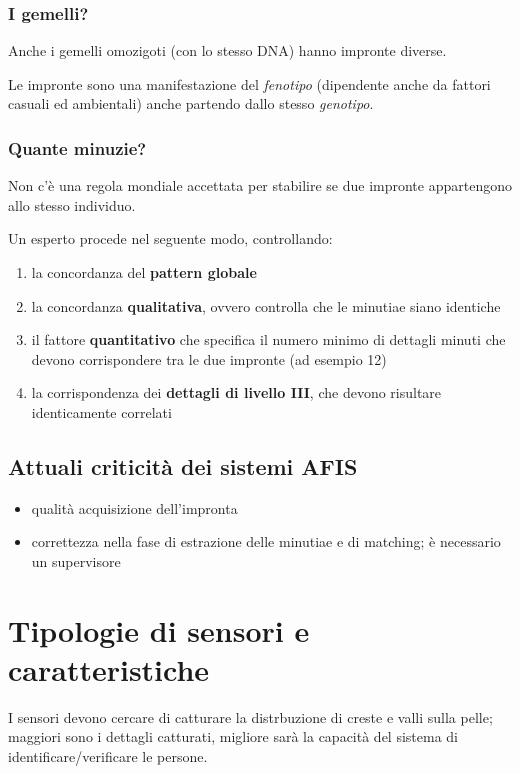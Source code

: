 \subsubsection{I gemelli?}

Anche i gemelli omozigoti (con lo stesso DNA) hanno impronte diverse.

\noindent Le impronte sono una manifestazione del \textit{fenotipo} (dipendente anche da fattori casuali ed 
ambientali) anche partendo dallo stesso \textit{genotipo}.

\subsubsection{Quante minuzie?}
Non c'è una regola mondiale accettata per stabilire se due impronte appartengono allo stesso
individuo.

Un esperto procede nel seguente modo, controllando:
\begin{enumerate}
    \item la concordanza del \textbf{pattern globale}
    \item la concordanza \textbf{qualitativa}, ovvero controlla che le minutiae siano identiche
    \item il fattore \textbf{quantitativo} che specifica il numero minimo di dettagli minuti che
    devono corrispondere tra le due impronte (ad esempio 12)
    \item la corrispondenza dei \textbf{dettagli di livello III}, che devono risultare identicamente correlati
\end{enumerate}

\subsection{Attuali criticità dei sistemi AFIS}

\begin{itemize}
    \item qualità acquisizione dell'impronta
    \item correttezza nella fase di estrazione delle minutiae e di matching; è necessario un supervisore
\end{itemize}

\section{Tipologie di sensori e caratteristiche}

I sensori devono cercare di catturare la distrbuzione di creste e valli sulla pelle;
maggiori sono i dettagli catturati, migliore sarà la capacità del sistema di 
identificare/verificare le persone.

